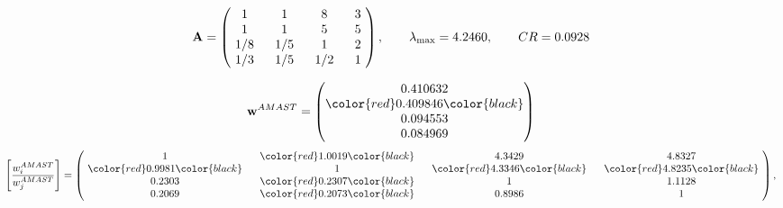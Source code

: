 \begin{example}
\begin{equation*}
\mathbf{A} =
\begin{pmatrix}
$\,\,$ 1 $\,\,$ & $\,\,$1$\,\,$ & $\,\,$8$\,\,$ & $\,\,$3 $\,\,$ \\
$\,\,$ 1 $\,\,$ & $\,\,$ 1 $\,\,$ & $\,\,$5$\,\,$ & $\,\,$5 $\,\,$ \\
$\,\,$ 1/8$\,\,$ & $\,\,$ 1/5$\,\,$ & $\,\,$ 1 $\,\,$ & $\,\,$2 $\,\,$ \\
$\,\,$ 1/3$\,\,$ & $\,\,$ 1/5$\,\,$ & $\,\,$ 1/2$\,\,$ & $\,\,$ 1  $\,\,$ \\
\end{pmatrix},
\qquad
\lambda_{\max} =
4.2460,
\qquad
CR = 0.0928
\end{equation*}

\begin{equation*}
\mathbf{w}^{AMAST} =
\begin{pmatrix}
0.410632\\
\color{red} 0.409846\color{black} \\
0.094553\\
0.084969
\end{pmatrix}\end{equation*}
\begin{equation*}
\left[ \frac{{w}^{AMAST}_i}{{w}^{AMAST}_j} \right] =
\begin{pmatrix}
$\,\,$ 1 $\,\,$ & $\,\,$\color{red} 1.0019\color{black} $\,\,$ & $\,\,$4.3429$\,\,$ & $\,\,$4.8327$\,\,$ \\
$\,\,$\color{red} 0.9981\color{black} $\,\,$ & $\,\,$ 1 $\,\,$ & $\,\,$\color{red} 4.3346\color{black} $\,\,$ & $\,\,$\color{red} 4.8235\color{black}   $\,\,$ \\
$\,\,$0.2303$\,\,$ & $\,\,$\color{red} 0.2307\color{black} $\,\,$ & $\,\,$ 1 $\,\,$ & $\,\,$1.1128 $\,\,$ \\
$\,\,$0.2069$\,\,$ & $\,\,$\color{red} 0.2073\color{black} $\,\,$ & $\,\,$0.8986$\,\,$ & $\,\,$ 1  $\,\,$ \\
\end{pmatrix},
\end{equation*}


\end{example}
